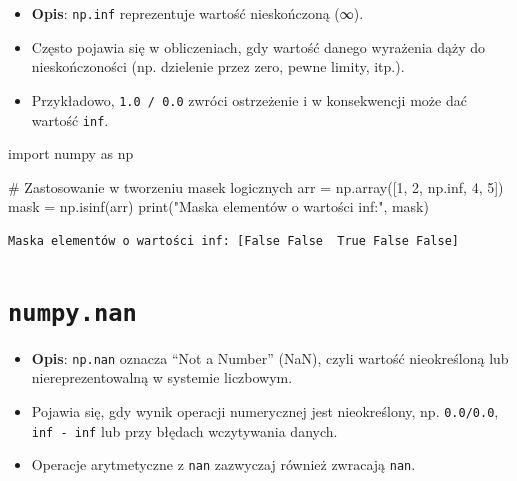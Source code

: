 \documentclass[
  polish,
  letterpaper,
  DIV=11,
  numbers=noendperiod]{scrreprt}
\newenvironment{Shaded}{\begin{snugshade}}{\end{snugshade}}
\newcommand{\BuiltInTok}[1]{\textcolor[rgb]{0.00,0.23,0.31}{#1}}
\newcommand{\CommentTok}[1]{\textcolor[rgb]{0.37,0.37,0.37}{#1}}
\newcommand{\DecValTok}[1]{\textcolor[rgb]{0.68,0.00,0.00}{#1}}
\newcommand{\ImportTok}[1]{\textcolor[rgb]{0.00,0.46,0.62}{#1}}
\newcommand{\NormalTok}[1]{\textcolor[rgb]{0.00,0.23,0.31}{#1}}
\newcommand{\OperatorTok}[1]{\textcolor[rgb]{0.37,0.37,0.37}{#1}}
\newcommand{\StringTok}[1]{\textcolor[rgb]{0.13,0.47,0.30}{#1}}
\providecommand{\tightlist}{%
  \setlength{\itemsep}{0pt}\setlength{\parskip}{0pt}}
\begin{document}
\begin{itemize}
\tightlist
\item
  \textbf{Opis}: \texttt{np.inf} reprezentuje wartość nieskończoną
  (∞).\\
\item
  Często pojawia się w obliczeniach, gdy wartość danego wyrażenia dąży
  do nieskończoności (np. dzielenie przez zero, pewne limity, itp.).\\
\item
  Przykładowo, \texttt{1.0\ /\ 0.0} zwróci ostrzeżenie i w konsekwencji
  może dać wartość \texttt{inf}.
\end{itemize}

\begin{Shaded}
\begin{Highlighting}[]
\ImportTok{import}\NormalTok{ numpy }\ImportTok{as}\NormalTok{ np}

\CommentTok{\# Zastosowanie w tworzeniu masek logicznych}
\NormalTok{arr }\OperatorTok{=}\NormalTok{ np.array([}\DecValTok{1}\NormalTok{, }\DecValTok{2}\NormalTok{, np.inf, }\DecValTok{4}\NormalTok{, }\DecValTok{5}\NormalTok{])}
\NormalTok{mask }\OperatorTok{=}\NormalTok{ np.isinf(arr)}
\BuiltInTok{print}\NormalTok{(}\StringTok{"Maska elementów o wartości inf:"}\NormalTok{, mask)}
\end{Highlighting}
\end{Shaded}

\begin{verbatim}
Maska elementów o wartości inf: [False False  True False False]
\end{verbatim}

\section{\texorpdfstring{\texttt{numpy.nan}}{numpy.nan}}\label{numpy.nan}

\begin{itemize}
\tightlist
\item
  \textbf{Opis}: \texttt{np.nan} oznacza ``Not a Number'' (NaN), czyli
  wartość nieokreśloną lub niereprezentowalną w systemie liczbowym.\\
\item
  Pojawia się, gdy wynik operacji numerycznej jest nieokreślony, np.
  \texttt{0.0/0.0}, \texttt{inf\ -\ inf} lub przy błędach wczytywania
  danych.\\
\item
  Operacje arytmetyczne z \texttt{nan} zazwyczaj również zwracają
  \texttt{nan}.
\end{itemize}
\end{document}
